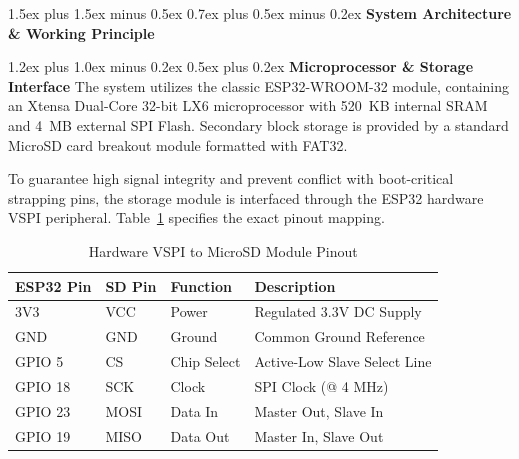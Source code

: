 ﻿\documentclass[conference]{IEEEtran}
\makeatletter
\renewcommand\section{\@startsection{section}{1}{\z@}%
  {1.5ex plus 1.5ex minus 0.5ex}%
  {0.7ex plus 0.5ex minus 0.2ex}%
  {\normalfont\normalsize\bfseries\centering}}
\renewcommand\subsection{\@startsection{subsection}{2}{\z@}%
  {1.2ex plus 1.0ex minus 0.2ex}%
  {0.5ex plus 0.2ex}%
  {\normalfont\normalsize\bfseries}}
\makeatother
\begin{document}
\section{\textbf{System Architecture \& Working Principle}}

\subsection{\textbf{Microprocessor \& Storage Interface}}
The system utilizes the classic ESP32-WROOM-32 module, containing an Xtensa Dual-Core 32-bit LX6 microprocessor with 520~KB internal SRAM and 4~MB external SPI Flash. Secondary block storage is provided by a standard MicroSD card breakout module formatted with FAT32.

To guarantee high signal integrity and prevent conflict with boot-critical strapping pins, the storage module is interfaced through the ESP32 hardware VSPI peripheral. Table~\ref{tab:pinout} specifies the exact pinout mapping.

\begin{table}[htbp]
\caption{Hardware VSPI to MicroSD Module Pinout}
\begin{center}
\begin{tabularx}{\columnwidth}{l l l X}
\toprule
\textbf{ESP32 Pin} & \textbf{SD Pin} & \textbf{Function} & \textbf{Description} \\
\midrule
3V3 & VCC & Power & Regulated 3.3V DC Supply \\
GND & GND & Ground & Common Ground Reference \\
GPIO 5 & CS & Chip Select & Active-Low Slave Select Line \\
GPIO 18 & SCK & Clock & SPI Clock (@ 4 MHz) \\
GPIO 23 & MOSI & Data In & Master Out, Slave In \\
GPIO 19 & MISO & Data Out & Master In, Slave Out \\
\bottomrule
\end{tabularx}
\label{tab:pinout}
\end{center}
\end{table}
\end{document}
